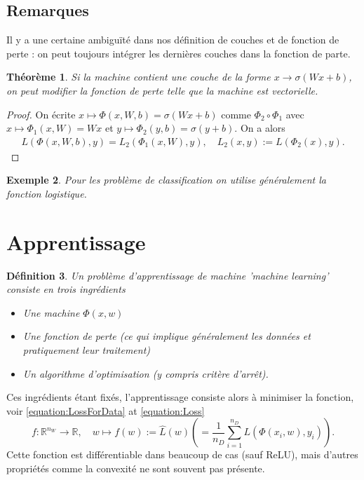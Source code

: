 \documentclass[11pt,a4paper, french]{article}
\newcommand{\ndata}{n_D}
\newcommand{\R}{\mathbb R}
\newtheorem{theorem}{Théorème}[section]
\newtheorem{definition}[theorem]{Définition}
\newtheorem{example}[theorem]{Exemple}
\begin{document}
\subsection{Remarques}\label{subsec:}
%
Il y a une certaine ambiguïté dans nos définition de couches et de fonction de perte : on peut toujours intégrer les dernières couches dans la fonction de parte.
%
%
\begin{theorem}\label{theorem:}
Si la machine contient une couche de la forme $x\to \sigma(Wx+b)$, on peut modifier la fonction de perte telle que la machine est vectorielle.
\end{theorem}
%
%
\begin{proof}
On écrite $x\mapsto\Phi(x,W,b) = \sigma(Wx+b)$ comme $\Phi_2 \circ \Phi_1$ avec $x\mapsto \Phi_1(x,W) = Wx$ et $y\mapsto\Phi_2(y,b) = \sigma(y+b)$. On a alors
\begin{align*}
L(\Phi(x,W,b), y) = L_2(\Phi_1(x,W),y),\quad L_2 (x,y) := L(\Phi_2(x),y).
\end{align*}
\end{proof}
%
%
\begin{example}\label{example:}
Pour les problème de classification on utilise généralement la fonction logistique.
\end{example}
%
%
\section{Apprentissage}\label{sec:}
%
%
\begin{definition}\label{definition:}
Un problème d'apprentissage de machine 'machine learning' consiste en trois ingrédients
\begin{itemize}
\item Une machine $\Phi(x,w)$
\item Une fonction de perte (ce qui implique généralement les données et pratiquement leur traitement)
\item Un algorithme d'optimisation (y compris critère d'arrêt).
\end{itemize}
\end{definition}
%
Ces ingrédients étant fixés, l'apprentissage consiste alors à minimiser la fonction, voir \eqref{equation:LossForData} at \eqref{equation:Loss}
%
\begin{equation}\label{equation:Lossf}
f: \R^{n_W}\to \R,\quad w\mapsto f(w) := \widehat{L}(w) \left( = \frac{1}{\ndata}\sum_{i=1}^{\ndata} L(\Phi(x_i,w),y_i) \right).
\end{equation}
%
Cette fonction est différentiable dans beaucoup de cas (sauf ReLU), mais d'autres propriétés comme la convexité ne sont souvent pas présente.
%
\end{document}
